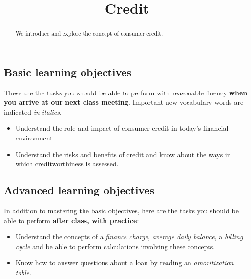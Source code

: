 \documentclass{ximera}
\title{Credit}
\begin{document}
\begin{abstract}
We introduce and explore the concept of consumer credit.
\end{abstract}
\maketitle

\subsection*{Basic learning objectives}

These are the tasks you should be able to perform with reasonable fluency \textbf{when you arrive at our next class meeting}. Important new vocabulary words are indicated \emph{in italics}. 

\begin{itemize}
	\item Understand the role and impact of consumer credit in today's financial environment.
    \item Understand the risks and benefits of credit and know about the ways in which creditworthiness is assessed.
\end{itemize}

\subsection*{Advanced learning objectives}

In addition to mastering the basic objectives, here are the tasks you should be able to perform \textbf{after class, with practice}: 

\begin{itemize}
	\item Understand the concepts of a \emph{finance charge}, \emph{average daily balance}, a \emph{billing cycle} and be able to perform calculations involving these concepts.
    \item Know how to answer questions about a loan by reading an \emph{amoritization table}.
\end{itemize}
\end{document}

